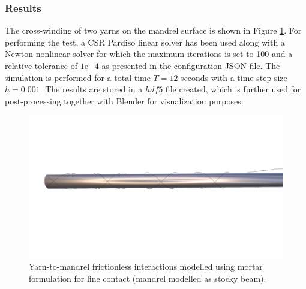 \subsubsection{Results}
The cross-winding of two yarns on the mandrel surface is shown in Figure \ref{testsetup}. For performing the test, a CSR Pardiso linear solver has been used along with a Newton nonlinear solver for which the maximum iterations is set to 100 and a relative tolerance of $1\mathrm{e}{-4}$ as presented in the configuration JSON file. The simulation is performed for a total time $T = 12$ seconds with a time step size $h = 0.001$. The results are stored in a $hdf5$ file created, which is further used for post-processing together with Blender for visualization purposes.

\begin{figure}[h]
    \centering
    \includegraphics[width=400pt]{figures/mortaryarnmandrel_1.png}
    \caption{Yarn-to-mandrel frictionless interactions modelled using mortar formulation for line contact (mandrel modelled as stocky beam).}
    \label{testsetup}
\end{figure}

















